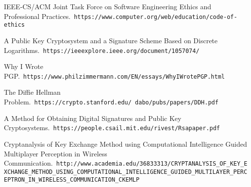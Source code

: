 \documentclass[12pt]{report}
\begin{document}
\newpage

\begin{thebibliography}{9}

    IEEE-CS/ACM Joint Task Force on Software Engineering Ethics and Professional Practices.\
    \texttt{https://www.computer.org/web/education/code-of-ethics}
    
    A Public Key Cryptosystem and a Signature Scheme Based on Discrete Logarithms.\
    \texttt{https://ieeexplore.ieee.org/document/1057074/}
    
    Why I Wrote PGP.\
    \texttt{https://www.philzimmermann.com/EN/essays/WhyIWrotePGP.html}
    
    \bibitem{stanford}
    The Diffie Hellman Problem.\
    \texttt{https://crypto.stanford.edu/~dabo/pubs/papers/DDH.pdf}
    
    \bibitem{mit}
    A Method for Obtaining Digital Signatures and Public Key Cryptosystems.\
    \texttt{https://people.csail.mit.edu/rivest/Rsapaper.pdf}
    
    Cryptanalysis of Key Exchange Method using Computational Intelligence Guided Multiplayer Perception in Wireless Communication.\
    \texttt{http://www.academia.edu/36833313/CRYPTANALYSIS_OF_KEY_EXCHANGE_METHOD_USING_COMPUTATIONAL_INTELLIGENCE_GUIDED_MULTILAYER_PERCEPTRON_IN_WIRELESS_COMMUNICATION_CKEMLP}

\end{thebibliography}
\end{document}
